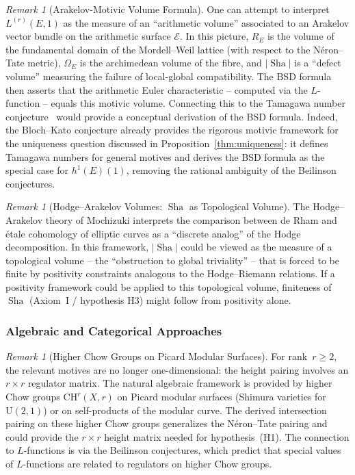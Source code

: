 \documentclass[aps,prd,twocolumn,superscriptaddress,nofootinbib,floatfix]{revtex4-2}
\theoremstyle{definition}
\theoremstyle{remark}
\newtheorem{remark}[theorem]{Remark}
\DeclareMathOperator{\Sha}{Sha}
\begin{document}
\begin{remark}[Arakelov-Motivic Volume Formula]
\label{rem:arakelov-volume}
One can attempt to interpret $L^{(r)}(E,1)$ as the measure of an ``arithmetic volume'' associated to an Arakelov vector bundle on the arithmetic surface $\mathcal{E}$. In this picture, $R_E$ is the volume of the fundamental domain of the Mordell--Weil lattice (with respect to the Néron--Tate metric), $\Omega_E$ is the archimedean volume of the fibre, and $|\Sha|$ is a ``defect volume'' measuring the failure of local-global compatibility. The BSD formula then asserts that the arithmetic Euler characteristic -- computed via the $L$-function -- equals this motivic volume. Connecting this to the Tamagawa number conjecture~\cite{BlochKato1990,FontainePerrinRiou1994} would provide a conceptual derivation of the BSD formula. Indeed, the Bloch--Kato conjecture already provides the rigorous motivic framework for the uniqueness question discussed in Proposition~\ref{thm:uniqueness}: it defines Tamagawa numbers for general motives and derives the BSD formula as the special case for $h^1(E)(1)$, removing the rational ambiguity of the Beilinson conjectures.
\end{remark}

\begin{remark}[Hodge--Arakelov Volumes: $\Sha$ as Topological Volume]
\label{rem:hodge-arakelov-sha}
The Hodge--Arakelov theory of Mochizuki interprets the comparison between de Rham and étale cohomology of elliptic curves as a ``discrete analog'' of the Hodge decomposition. In this framework, $|\Sha|$ could be viewed as the measure of a topological volume -- the ``obstruction to global triviality'' -- that is forced to be finite by positivity constraints analogous to the Hodge--Riemann relations. If a positivity framework could be applied to this topological volume, finiteness of $\Sha$ (Axiom~I / hypothesis H3) might follow from positivity alone.
\end{remark}

\subsubsection{Algebraic and Categorical Approaches}

\begin{remark}[Higher Chow Groups on Picard Modular Surfaces]
\label{rem:chow-groups}
For rank~$r \geq 2$, the relevant motives are no longer one-dimensional: the height pairing involves an $r \times r$ regulator matrix. The natural algebraic framework is provided by higher Chow groups $\mathrm{CH}^r(X, r)$ on Picard modular surfaces (Shimura varieties for $\mathrm{U}(2,1)$) or on self-products of the modular curve. The derived intersection pairing on these higher Chow groups generalizes the Néron--Tate pairing and could provide the $r \times r$ height matrix needed for hypothesis~(H1). The connection to $L$-functions is via the Beilinson conjectures, which predict that special values of $L$-functions are related to regulators on higher Chow groups.
\end{remark}
\end{document}
